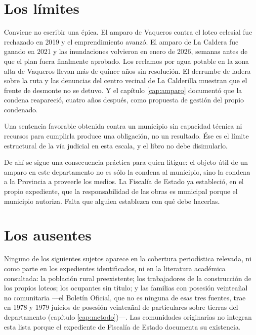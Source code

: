 \section{Los límites}

Conviene no escribir una épica. El amparo de Vaqueros contra el loteo eclesial fue rechazado en 2019 y el emprendimiento avanzó. El amparo de La Caldera fue ganado en 2021 y las inundaciones volvieron en enero de 2026, semanas antes de que el plan fuera finalmente aprobado. Los reclamos por agua potable en la zona alta de Vaqueros llevan más de quince años sin resolución. El derrumbe de ladera sobre la ruta y las denuncias del centro vecinal de La Calderilla muestran que el frente de desmonte no se detuvo. Y el capítulo \ref{cap:amparo} documentó que la condena reapareció, cuatro años después, como propuesta de gestión del propio condenado.

\begin{cautela}
Una sentencia favorable obtenida contra un municipio sin capacidad técnica ni recursos para cumplirla produce una obligación, no un resultado. Ése es el límite estructural de la vía judicial en esta escala, y el libro no debe disimularlo.

De ahí se sigue una consecuencia práctica para quien litigue: el objeto útil de un amparo en este departamento no es sólo la condena al municipio, sino la condena a la Provincia a proveerle los medios. La Fiscalía de Estado ya estableció, en el propio expediente, que la responsabilidad de las obras es municipal porque el municipio autoriza. Falta que alguien establezca con qué debe hacerlas.
\end{cautela}

\section{Los ausentes}

Ninguno de los siguientes sujetos aparece en la cobertura periodística relevada, ni como parte en los expedientes identificados, ni en la literatura académica consultada: la población rural preexistente; los trabajadores de la construcción de los propios loteos; los ocupantes sin título; y las familias con posesión veinteañal no comunitaria ---el Boletín Oficial, que no es ninguna de esas tres fuentes, trae en 1978 y 1979 juicios de posesión veinteañal de particulares sobre tierras del departamento (capítulo \ref{cap:metodo})---. Las comunidades originarias no integran esta lista porque el expediente de Fiscalía de Estado documenta su existencia.

